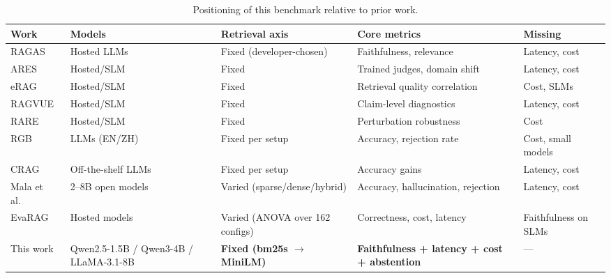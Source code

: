 
\begin{table}[h]
\centering
\caption{Positioning of this benchmark relative to prior work.}
\label{tab:positioning}
\begin{tabular}{llllp{2.6cm}}
\toprule
\textbf{Work} & \textbf{Models} & \textbf{Retrieval axis} & \textbf{Core metrics} & \textbf{Missing} \\
\midrule
RAGAS~\cite{es2023ragas} & Hosted LLMs & Fixed (developer-chosen) & Faithfulness, relevance & Latency, cost \\
ARES~\cite{saadfalcon2023ares} & Hosted/SLM & Fixed & Trained judges, domain shift & Latency, cost \\
eRAG~\cite{salemi2024erag} & Hosted/SLM & Fixed & Retrieval quality correlation & Cost, SLMs \\
RAGVUE~\cite{murugaraj2025ragvue} & Hosted/SLM & Fixed & Claim-level diagnostics & Latency, cost \\
RARE~\cite{zeng2025rare} & Hosted/SLM & Fixed & Perturbation robustness & Cost \\
RGB~\cite{chen2023rgb} & LLMs (EN/ZH) & Fixed per setup & Accuracy, rejection rate & Cost, small models \\
CRAG~\cite{yan2024crag} & Off-the-shelf LLMs & Fixed per setup & Accuracy gains & Latency, cost \\
Mala et al.~\cite{mala2026faithfulness} & 2--8B open models & Varied (sparse/dense/hybrid) & Accuracy, hallucination, rejection & Latency, cost \\
EvaRAG~\cite{elkiran2026empirical} & Hosted models & Varied (ANOVA over 162 configs) & Correctness, cost, latency & Faithfulness on SLMs \\
This work & Qwen2.5-1.5B / Qwen3-4B / LLaMA-3.1-8B & \textbf{Fixed (bm25s $\to$ MiniLM)} & \textbf{Faithfulness + latency + cost + abstention} & --- \\
\bottomrule
\end{tabular}
\end{table}
